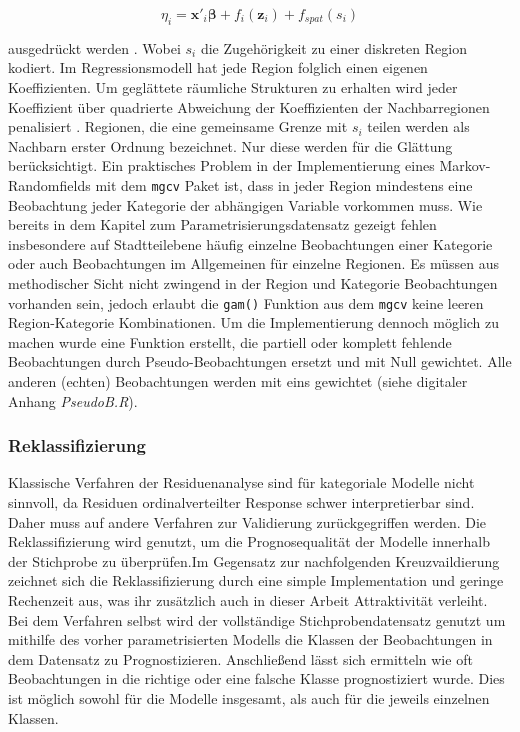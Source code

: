 \documentclass{Vorlage}
\begin{document}
\begin{equation}
\eta_{i} =\mathbf{x}'_i \boldsymbol{\beta}+f_{i}(\mathbf{z}_{i})+f_{spat}(s_i)
\end{equation}

ausgedrückt werden \cite[p. 541]{fahrmeir2013regression}. Wobei $s_i$ die Zugehörigkeit zu einer diskreten Region kodiert. Im Regressionsmodell hat jede Region folglich einen eigenen Koeffizienten. Um geglättete räumliche Strukturen zu erhalten wird jeder Koeffizient über quadrierte Abweichung der Koeffizienten der Nachbarregionen penalisiert \cite[p. 522]{fahrmeir2013regression}. Regionen, die eine gemeinsame Grenze mit $s_i$ teilen werden als Nachbarn erster Ordnung bezeichnet. Nur diese werden für die Glättung berücksichtigt.
Ein praktisches Problem in der Implementierung eines Markov-Randomfields mit dem \texttt{mgcv} Paket ist, dass in jeder Region mindestens eine Beobachtung jeder Kategorie der abhängigen Variable vorkommen muss. Wie bereits in dem Kapitel zum Parametrisierungsdatensatz gezeigt fehlen insbesondere auf Stadtteilebene häufig einzelne Beobachtungen einer Kategorie oder auch Beobachtungen im Allgemeinen für einzelne Regionen. Es müssen aus methodischer Sicht nicht zwingend in der Region und Kategorie Beobachtungen vorhanden sein, jedoch erlaubt die \texttt{gam()} Funktion aus dem \texttt{mgcv} keine leeren Region-Kategorie Kombinationen. Um die Implementierung dennoch möglich zu machen wurde eine Funktion erstellt, die partiell oder komplett fehlende Beobachtungen durch Pseudo-Beobachtungen ersetzt und mit Null gewichtet. Alle anderen (echten) Beobachtungen werden mit eins gewichtet (siehe digitaler Anhang \textit{PseudoB.R}).

\subsubsection{Reklassifizierung}
Klassische Verfahren der Residuenanalyse sind für kategoriale Modelle nicht sinnvoll, da Residuen ordinalverteilter Response schwer interpretierbar sind. Daher muss auf andere Verfahren zur Validierung zurückgegriffen werden. Die Reklassifizierung wird genutzt, um die Prognosequalität der Modelle innerhalb der Stichprobe zu überprüfen.Im Gegensatz zur nachfolgenden Kreuzvaildierung zeichnet sich die Reklassifizierung durch eine simple Implementation und geringe Rechenzeit aus, was ihr zusätzlich auch in dieser Arbeit Attraktivität verleiht. Bei dem Verfahren selbst wird der vollständige Stichprobendatensatz genutzt um mithilfe des vorher parametrisierten Modells die Klassen der Beobachtungen in dem Datensatz zu Prognostizieren. Anschließend lässt sich ermitteln wie oft Beobachtungen in die richtige oder eine falsche Klasse prognostiziert wurde. Dies ist möglich sowohl für die Modelle insgesamt, als auch für die jeweils einzelnen Klassen.
\end{document}
